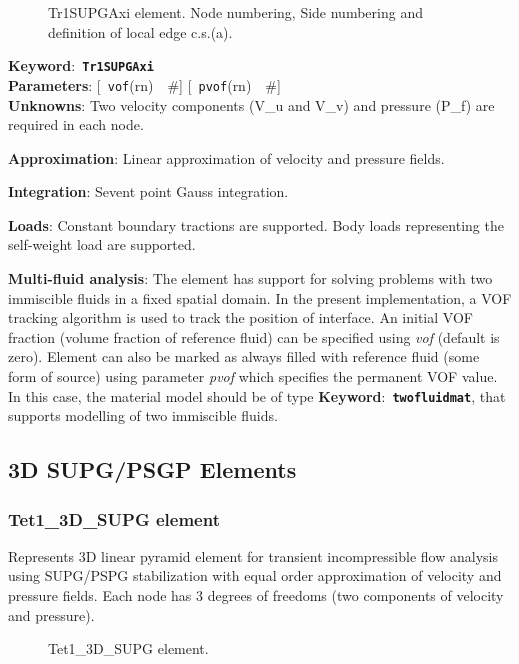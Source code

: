 \documentclass[a4paper]{article}
\newcommand{\descitem}[1]{{\noindent \bf #1}:}
\newcommand{\elemkeyword}[1]{\descitem{Keyword}~{\bf \texttt{#1}}}
\newcommand{\elemparam}[2]{{{\texttt{#1}\tiny (#2)}~~\#}}
\newcommand{\optelemparam}[2]{{[~\elemparam{#1}{#2}]}}
\newcommand{\param}[1]{{\em #1}}
\begin{document}
\begin{figure}[tb]
 \centering
 \begin{makeimage}
  
 \end{makeimage}
 \caption{Tr1SUPGAxi element. Node numbering, Side numbering and
 definition of local edge c.s.(a).}
 \label{Tr1SUPGAxifig}
\end{figure}

\elemkeyword{Tr1SUPGAxi}\\
\descitem{Parameters} \optelemparam{vof}{rn}
\optelemparam{pvof}{rn}\\
\descitem{Unknowns}
Two velocity components (V\_u and V\_v) and pressure (P\_f) are required in each node.

\descitem{Approximation} Linear approximation of velocity and pressure
fields.

\descitem{Integration}
Sevent point Gauss integration.

\descitem{Loads} Constant boundary tractions are supported. Body loads
representing the self-weight load are supported.

\descitem{Multi-fluid analysis} The element has support for solving
problems with two immiscible fluids in
a fixed spatial domain. In the present implementation, a VOF tracking algorithm
is used to track the position of interface. An initial VOF fraction
(volume fraction of reference fluid) can be specified using
\param{vof} (default is zero). Element can also be marked as always
filled with reference fluid (some form of source) using parameter
\param{pvof} which specifies the permanent VOF value. In this case,
the material model should be of type \elemkeyword{twofluidmat}, that
supports modelling of two immiscible fluids.

\subsection{3D SUPG/PSGP Elements}
\subsubsection{Tet1\_3D\_SUPG element}
\label{PY1_3D_SUPG}
Represents 3D linear pyramid element for transient
incompressible flow analysis using SUPG/PSPG stabilization with equal order
approximation of velocity and pressure fields. Each node has 3 degrees
of freedoms (two components of velocity and pressure).

\begin{figure}[tb]
 \centering
 \begin{makeimage}
  
 \end{makeimage}
 \caption{Tet1\_3D\_SUPG element.}
 \label{PY1_3D_SUPGfig}
\end{figure}
\end{document}
